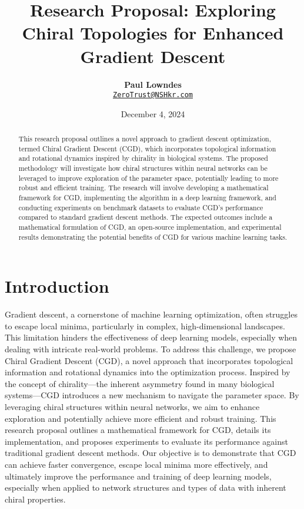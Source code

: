 \documentclass[12pt, a4paper]{article}
\title{\vspace{-2cm}\textbf{Research Proposal: Exploring Chiral Topologies for Enhanced Gradient Descent}}
\author{\textbf{Paul Lowndes} \\ \href{mailto:ZeroTrust@NSHkr.com}{\texttt{ZeroTrust@NSHkr.com}}}
\date{\small December 4, 2024}
\begin{document}
\maketitle
\vspace{-1.5em} 

\begin{abstract}
This research proposal outlines a novel approach to gradient descent optimization, termed Chiral Gradient Descent (CGD), which incorporates topological information and rotational dynamics inspired by chirality in biological systems. The proposed methodology will investigate how chiral structures within neural networks can be leveraged to improve exploration of the parameter space, potentially leading to more robust and efficient training. The research will involve developing a mathematical framework for CGD, implementing the algorithm in a deep learning framework, and conducting experiments on benchmark datasets to evaluate CGD's performance compared to standard gradient descent methods. The expected outcomes include a mathematical formulation of CGD, an open-source implementation, and experimental results demonstrating the potential benefits of CGD for various machine learning tasks.
\end{abstract}

\section{Introduction}

Gradient descent, a cornerstone of machine learning optimization, often struggles to escape local minima, particularly in complex, high-dimensional landscapes. This limitation hinders the effectiveness of deep learning models, especially when dealing with intricate real-world problems. To address this challenge, we propose Chiral Gradient Descent (CGD), a novel approach that incorporates topological information and rotational dynamics into the optimization process. Inspired by the concept of chirality—the inherent asymmetry found in many biological systems—CGD introduces a new mechanism to navigate the parameter space. By leveraging chiral structures within neural networks, we aim to enhance exploration and potentially achieve more efficient and robust training. This research proposal outlines a mathematical framework for CGD, details its implementation, and proposes experiments to evaluate its performance against traditional gradient descent methods.  Our objective is to demonstrate that CGD can achieve faster convergence, escape local minima more effectively, and ultimately improve the performance and training of deep learning models, especially when applied to network structures and types of data with inherent chiral properties.
\end{document}
